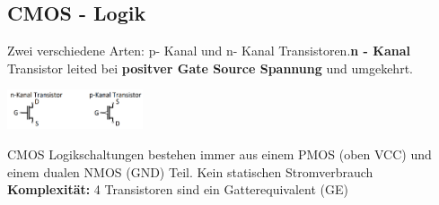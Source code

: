 \documentclass[10pt]{article}
\begin{document}
\subsection{CMOS - Logik}
\begin{multicols}{2}
    Zwei verschiedene Arten: p- Kanal und n- Kanal Transistoren.\textbf{n - Kanal} Transistor leited bei \textbf{positver Gate Source Spannung} und umgekehrt.
    \columnbreak
    \begin{center}
    \includegraphics[width=0.3\textwidth]{np_Trans.PNG}
\end{center}    
\end{multicols}
CMOS Logikschaltungen bestehen immer aus einem PMOS (oben VCC) und einem dualen NMOS (GND) Teil. Kein statischen Stromverbrauch \\
\textbf{Komplexität: } 4 Transistoren sind ein Gatterequivalent (GE) 
\end{document}
